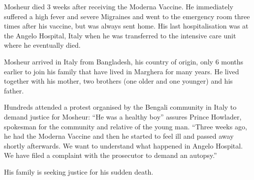 Mosheur died 3 weeks after receiving the Moderna Vaccine. He immediately
suffered a high fever and severe Migraines and went to the emergency room three
times after his vaccine, but was always sent home. His last hospitalisation was
at the Angelo Hospital, Italy when he was transferred to the intensive care unit
where he eventually died.

Mosheur arrived in Italy from Bangladesh, his country of origin, only 6 months
earlier to join his family that have lived in Marghera for many years. He lived
together with his mother, two brothers (one older and one younger) and his
father.

Hundreds attended a protest organised by the Bengali community in Italy to
demand justice for Mosheur: “He was a healthy boy” assures Prince Howlader,
spokesman for the community and relative of the young man. “Three weeks ago, he
had the Moderna Vaccine and then he started to feel ill and passed away shortly
afterwards. We want to understand what happened in Angelo Hospital. We have
filed a complaint with the prosecutor to demand an autopsy.”

His family is seeking justice for his sudden death.

